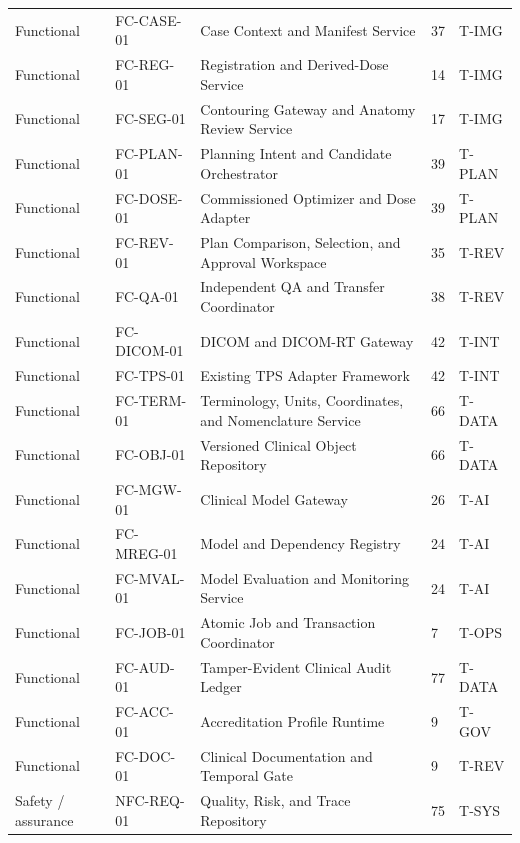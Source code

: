 \documentclass[11pt,letterpaper]{article}
\begin{document}
\begin{scriptsize}
\begin{longtable}{@{}L{0.12\textwidth}L{0.14\textwidth}L{0.44\textwidth}L{0.14\textwidth}L{0.08\textwidth}@{}}
\addlinespace[2pt]
Functional & FC-CASE-01 & Case Context and Manifest Service & 37 & T-IMG \\
\addlinespace[2pt]
Functional & FC-REG-01 & Registration and Derived-Dose Service & 14 & T-IMG \\
\addlinespace[2pt]
Functional & FC-SEG-01 & Contouring Gateway and Anatomy Review Service & 17 & T-IMG \\
\addlinespace[2pt]
Functional & FC-PLAN-01 & Planning Intent and Candidate Orchestrator & 39 & T-PLAN \\
\addlinespace[2pt]
Functional & FC-DOSE-01 & Commissioned Optimizer and Dose Adapter & 39 & T-PLAN \\
\addlinespace[2pt]
Functional & FC-REV-01 & Plan Comparison, Selection, and Approval Workspace & 35 & T-REV \\
\addlinespace[2pt]
Functional & FC-QA-01 & Independent QA and Transfer Coordinator & 38 & T-REV \\
\addlinespace[2pt]
Functional & FC-DICOM-01 & DICOM and DICOM-RT Gateway & 42 & T-INT \\
\addlinespace[2pt]
Functional & FC-TPS-01 & Existing TPS Adapter Framework & 42 & T-INT \\
\addlinespace[2pt]
Functional & FC-TERM-01 & Terminology, Units, Coordinates, and Nomenclature Service & 66 & T-DATA \\
\addlinespace[2pt]
Functional & FC-OBJ-01 & Versioned Clinical Object Repository & 66 & T-DATA \\
\addlinespace[2pt]
Functional & FC-MGW-01 & Clinical Model Gateway & 26 & T-AI \\
\addlinespace[2pt]
Functional & FC-MREG-01 & Model and Dependency Registry & 24 & T-AI \\
\addlinespace[2pt]
Functional & FC-MVAL-01 & Model Evaluation and Monitoring Service & 24 & T-AI \\
\addlinespace[2pt]
Functional & FC-JOB-01 & Atomic Job and Transaction Coordinator & 7 & T-OPS \\
\addlinespace[2pt]
Functional & FC-AUD-01 & Tamper-Evident Clinical Audit Ledger & 77 & T-DATA \\
\addlinespace[2pt]
Functional & FC-ACC-01 & Accreditation Profile Runtime & 9 & T-GOV \\
\addlinespace[2pt]
Functional & FC-DOC-01 & Clinical Documentation and Temporal Gate & 9 & T-REV \\
\addlinespace[2pt]
Safety / assurance & NFC-REQ-01 & Quality, Risk, and Trace Repository & 75 & T-SYS \\

\end{longtable}
\end{scriptsize}
\end{document}
